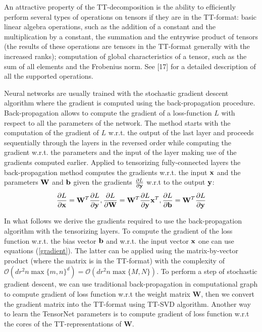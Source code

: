 \documentclass[onecolumn, conference]{IEEEtran}
\begin{document}
An attractive property of the TT-decomposition is the ability to efﬁciently perform several types of operations on tensors if they are in the TT-format: basic linear algebra operations, such as the addition of a constant and the multiplication by a constant, the summation and the entrywise product of tensors (the results of these operations are tensors in the TT-format generally with the increased ranks); computation of global characteristics of a tensor, such as the sum of all elements and the Frobenius norm. 
See [17] for a detailed description of all the supported operations.
\par 
Neural networks are usually trained with the stochastic gradient descent algorithm where the gradient is computed using the back-propagation procedure. 
Back-propagation allows to compute the gradient of a loss-function $L$ with respect to all the parameters of the network. 
The method starts with the computation of the gradient of $L$ w.r.t. the output of the last layer and proceeds sequentially through the layers in the reversed order while computing the gradient w.r.t. the parameters and the input of the layer making use of the gradients computed earlier. 
Applied to tensorizing fully-connected layers  the back-propagation method computes the gradients w.r.t. the input $\bf{x}$ and the parameters $\bf{W}$ and $\bf{b}$ given the gradients $\frac{\partial L}{\partial {\bf y}}$ w.r.t to the output ${\bf y}$:
\begin{equation}
    \label{gradient}
    \frac{\partial L}{\partial {\bf x}}={\bf W}^T \frac{\partial L}{\partial {\bf y}}, 
    \frac{\partial L}{\partial {\bf W}}={\bf W}^T \frac{\partial L}{\partial {\bf y}}{\bf x}^T,
    \frac{\partial L}{\partial {\bf b}}={\bf W}^T \frac{\partial L}{\partial {\bf y}}
\end{equation}

In what follows we derive the gradients required to use the back-propagation algorithm with the tensorizing layers. 
To compute the gradient of the loss function w.r.t. the bias vector ${\bf b}$ and w.r.t. the input vector ${\bf x}$ one can use equations (\ref{gradient}). 
The latter can be applied using the matrix-by-vector product (where the matrix is in the TT-format) with the complexity of $\mathcal{O}(dr^2n\max\{m,n\}^d)=\mathcal{O}(dr^2n\max\{M,N\})$.
To perform a step of stochastic gradient descent, we can use traditional back-propagation in computational graph to compute gradient of loss function w.r.t the weight matrix $\mathbf{W}$, then we convert the gradient matrix into the TT-format using TT-SVD algorithm. Another way to learn the TensorNet parameters is to 
compute gradient of loss function w.r.t the cores of the TT-representations of $\mathbf{W}$.
\end{document}
